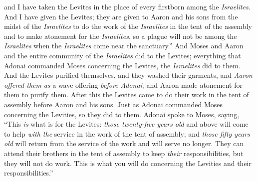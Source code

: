 \begin{biblechapter}
\verse and I have taken the Levites in the place of every firstborn among the \textit{Israelites}.
\verse And I have given the Levites; they are given to Aaron and his sons from the midst of the \textit{Israelites} to do the work of the \textit{Israelites} in the tent of the assembly and to make atonement for the \textit{Israelites}, so a plague will not be among the \textit{Israelites} when the \textit{Israelites} come near the sanctuary.”
\verse And Moses and Aaron and the entire community of the \textit{Israelites} did to the Levites; everything that Adonai commanded Moses concerning the Levites, the \textit{Israelites} did to them.
\verse And the Levites purified themselves, and they washed their garments, and \textit{Aaron offered them} \textit{as} a wave offering \textit{before Adonai}; and Aaron made atonement for them to purify them.
\verse After this the Levites came to do their work in the tent of assembly before Aaron and his sons. Just as Adonai commanded Moses concerning the Levities, so they did to them.
\verse Adonai spoke to Moses, saying,
\verse “This \textit{is} what is for the Levites: \textit{those twenty-five years old} and above will come to help \textit{with the} service in the work of the tent of assembly;
\verse and \textit{those fifty years old} will return from the service of the work and will serve no longer.
\verse They can attend their brothers in the tent of assembly to keep \textit{their} responsibilities, but they will not do work. This is what you will do concerning the Levities and their responsibilities.”
\end{biblechapter}

